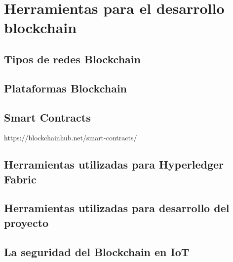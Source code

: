 \section{Herramientas para el desarrollo blockchain}

\subsection{Tipos de redes Blockchain}

\subsection{Plataformas Blockchain}

\subsection{Smart Contracts}

https://blockchainhub.net/smart-contracts/

\subsection{Herramientas utilizadas para Hyperledger Fabric}

\subsection{Herramientas utilizadas para desarrollo del proyecto}

\subsection{La seguridad del Blockchain en IoT}

\newpage